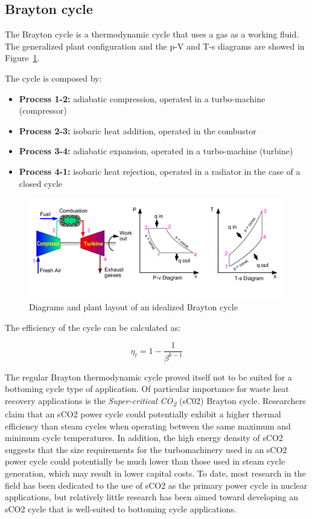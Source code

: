 \subsection{Brayton cycle}

The Brayton cycle is a thermodynamic cycle that uses a gas as a working fluid. The generalized plant configuration and the p-V and T-s diagrams are showed in Figure~\ref{fig:brayton_cycle}.

The cycle is composed by:

\begin{itemize}
\item \textbf{Process 1-2:} adiabatic compression, operated in a turbo-machine (compressor)
\item \textbf{Process 2-3:} isobaric heat addition, operated in the combustor
\item \textbf{Process 3-4:} adiabatic expansion, operated in a turbo-machine (turbine)
\item \textbf{Process 4-1:} isobaric heat rejection, operated in a radiator in the case of a closed cycle
\end{itemize}

\begin{figure}[ht]
  \centering
  \includegraphics[width=\textwidth]{figures/review/brayton_cycle.jpg}
  \caption{Diagrams and plant layout of an idealized Brayton cycle\label{fig:brayton_cycle} }
\end{figure}


The efficiency of the cycle can be calculated as:

\begin{equation}
  \eta_{t}=1-\frac{1}{\beta^{k-1}}
\end{equation}

The regular Brayton thermodynamic cycle proved itself not to be suited for a bottoming cycle type of application. Of particular importance for waste heat recovery applications is the \emph{Super-critical CO\textsubscript{2}} (sC02) Brayton cycle. Researchers claim \cite{Kimzey2012} that an sCO2 power cycle could potentially exhibit a higher thermal efficiency than steam cycles when operating between the same maximum and minimum cycle temperatures. In addition, the high energy density of sCO2 suggests that the size requirements for the turbomachinery used in an sCO2 power cycle could potentially be much lower than those used in steam cycle generation, which may result in lower capital costs. To date, most research in the field has been dedicated to the use of sCO2 as the primary power cycle in nuclear applications, but relatively little research has been aimed toward developing an sCO2 cycle that is well-suited to bottoming cycle applications.

